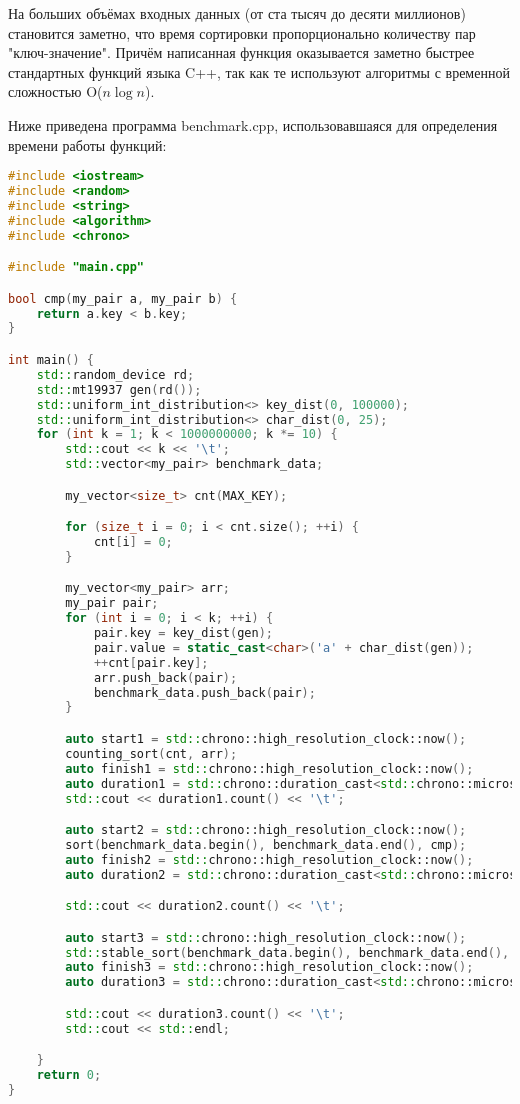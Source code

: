 \documentclass[12pt]{article}
\begin{document}
На больших объёмах входных данных (от ста тысяч до десяти миллионов) становится заметно, что время сортировки пропорционально количеству пар "ключ-значение". Причём написанная функция оказывается заметно быстрее стандартных функций языка C++, так как те используют алгоритмы с временной сложностью O($n \log{n}$).

Ниже приведена программа benchmark.cpp, использовавшаяся для определения времени работы функций:
\begin{lstlisting}[language=C++]
#include <iostream>
#include <random>
#include <string>
#include <algorithm>
#include <chrono>

#include "main.cpp"

bool cmp(my_pair a, my_pair b) {
    return a.key < b.key;
}

int main() {
    std::random_device rd;
    std::mt19937 gen(rd());
    std::uniform_int_distribution<> key_dist(0, 100000);
    std::uniform_int_distribution<> char_dist(0, 25);
    for (int k = 1; k < 1000000000; k *= 10) {
        std::cout << k << '\t';
        std::vector<my_pair> benchmark_data;

        my_vector<size_t> cnt(MAX_KEY);

        for (size_t i = 0; i < cnt.size(); ++i) {
            cnt[i] = 0;
        }

        my_vector<my_pair> arr;
        my_pair pair;
        for (int i = 0; i < k; ++i) {
            pair.key = key_dist(gen);
            pair.value = static_cast<char>('a' + char_dist(gen));
            ++cnt[pair.key];
            arr.push_back(pair);
            benchmark_data.push_back(pair);
        }

        auto start1 = std::chrono::high_resolution_clock::now();
        counting_sort(cnt, arr);
        auto finish1 = std::chrono::high_resolution_clock::now();
        auto duration1 = std::chrono::duration_cast<std::chrono::microseconds>(finish1 - start1);
        std::cout << duration1.count() << '\t';

        auto start2 = std::chrono::high_resolution_clock::now();
        sort(benchmark_data.begin(), benchmark_data.end(), cmp);
        auto finish2 = std::chrono::high_resolution_clock::now();
        auto duration2 = std::chrono::duration_cast<std::chrono::microseconds>(finish2 - start2);

        std::cout << duration2.count() << '\t';

        auto start3 = std::chrono::high_resolution_clock::now();
        std::stable_sort(benchmark_data.begin(), benchmark_data.end(), cmp);
        auto finish3 = std::chrono::high_resolution_clock::now();
        auto duration3 = std::chrono::duration_cast<std::chrono::microseconds>(finish3 - start3);

        std::cout << duration3.count() << '\t';
        std::cout << std::endl;

    }
    return 0;
}


\end{lstlisting}
\end{document}
